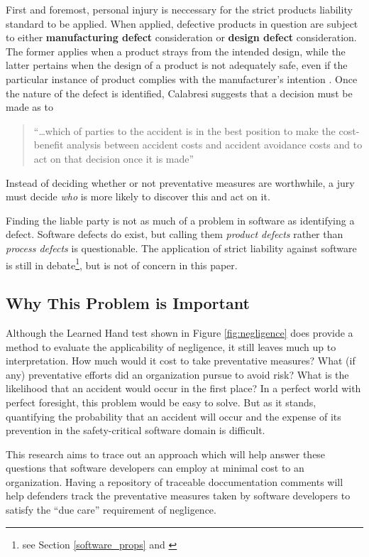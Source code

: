 First and foremost, personal injury is neccessary for the strict products
liability standard to be applied. When applied, defective products in question
are subject to either \textbf{manufacturing defect} consideration or
\textbf{design defect} consideration. The former applies when a product strays
from the intended design, while the latter pertains when the design of a product
is not adequately safe, even if the particular instance of product complies with
the manufacturer's intention \cite{Turner1999}. Once the nature of the defect is
identified, Calabresi suggests that  a decision must be made as to 
\begin{quote}
``\ldots which of parties to the accident is in the best position to make the
cost-benefit analysis between accident costs and accident avoidance costs and to
act on that decision once it is made'' \cite{Calabresi1972}
\end{quote}
 Instead of deciding whether or not preventative
measures are worthwhile, a jury must decide \textit{who} is more likely to 
discover this and act on it.

Finding the liable party is not as much of a problem in software as identifying
a defect. Software defects do exist, but calling them \textit{product defects} 
rather than \textit{process defects} is questionable. The application of strict
liability against software is still in debate\footnote{see Section
\ref{software_props} and \cite{Turner2000}}, but is not of concern in this
paper.

\subsection{Why This Problem is Important}
Although the Learned Hand test shown in Figure \ref{fig:negligence} does provide
a method to evaluate the applicability of negligence, it still leaves much up to
interpretation. How much would it cost to take preventative measures? What
(if any) preventative efforts did an organization pursue to avoid risk? What is
the likelihood that an accident would occur in the first place? In a perfect
world with perfect foresight, this problem would be easy to solve. But as it
stands, quantifying the probability that an accident will occur and the expense
of its prevention in the safety-critical software domain is difficult.

This research aims to trace out an approach which will help answer these
questions that software developers can employ at minimal cost to an 
organization. Having a repository of traceable doccumentation comments will help
defenders track the preventative measures taken by software developers to
satisfy the ``due care'' requirement of negligence.
